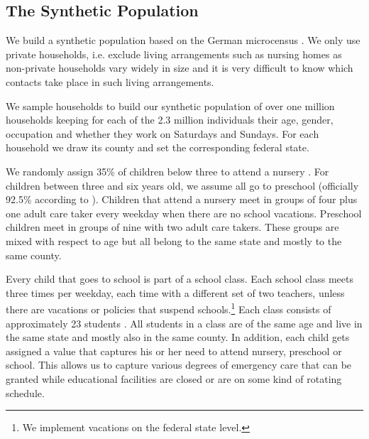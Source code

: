 \subsection{The Synthetic Population}
\label{subsec:synthetic_population}

We build a synthetic population based on the German microcensus \citep{FDSAeDBUDL2018}.
We only use private households, i.e. exclude living arrangements such as nursing homes as
non-private households vary widely in size and it is very difficult to know which
contacts take place in such living arrangements.

We sample households to build our synthetic population of over one million households
keeping for each of the 2.3 million individuals their age, gender, occupation and whether
they work on Saturdays and Sundays. For each household we draw its county and set the
corresponding federal state.%

We randomly assign 35\% of children below three to attend a nursery \citep{Destatis2020}.
For children between three and six years old, we assume all go to preschool (officially
92.5\% according to \cite{Destatis2020}).
Children that attend a nursery meet in groups of four \citep{BertelsmannStiftung2019}
plus one adult care taker every weekday when there are no school vacations. Preschool
children meet in groups of nine \citep{BertelsmannStiftung2019} with two adult care
takers. These groups are mixed with respect to age but all belong to the same state and
mostly to the same county.

Every child that goes to school is part of a school class. Each school class meets
three times per weekday, each time with a different set of two teachers, unless
there are vacations or policies that suspend schools.\footnote{We
implement vacations on the federal state level.} Each class consists of approximately 23
students \citep{OECD2013}. All students in a class are of the same age
and live in the same state and mostly also in the same county. In addition, each
child gets assigned a value that captures his or her need to attend nursery, preschool or
school. This allows us to capture various degrees of emergency care that can be granted
while educational facilities are closed or are on some kind of rotating schedule.

